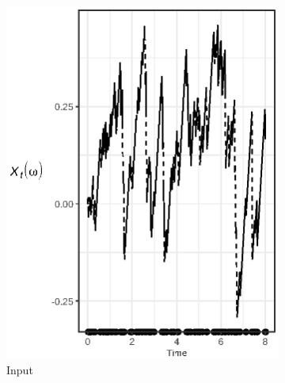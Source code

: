 \documentclass[titlepage]{article}
\theoremstyle{plain}
\theoremstyle{definition}
\begin{document}
{\begin{landscape}
\begin{figure}
\begin{subfigure}{0.45\linewidth}
        \includegraphics{input_ge_1}
        \caption{Input}
      \end{subfigure}
      \begin{subfigure}{0.45\linewidth}

\end{subfigure}
\end{figure}
\end{landscape}}
\end{document}
